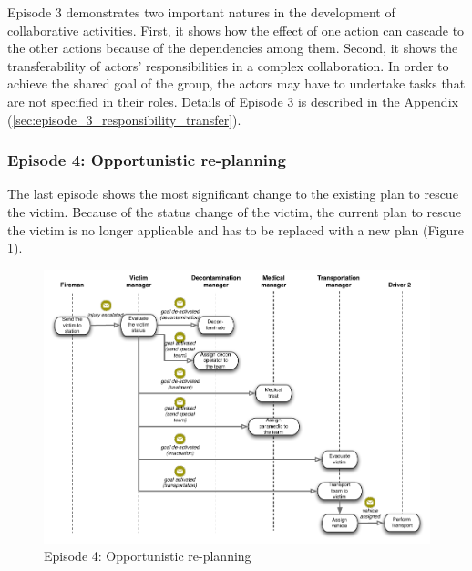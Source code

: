 Episode 3 demonstrates two important natures in the development of collaborative activities. First, it shows how the effect of one action can cascade to the other actions because of the dependencies among them. Second, it shows the transferability of actors' responsibilities in a complex collaboration. In order to achieve the shared goal of the group, the actors may have to undertake tasks that are not specified in their roles. Details of Episode 3 is described in the Appendix (\ref{sec:episode_3_responsibility_transfer}).

\subsubsection{Episode 4: Opportunistic re-planning} %
\label{ssub:episode_4_opportunistic_re_planning}
The last episode shows the most significant change to the existing plan to rescue the victim. Because of the status change of the victim, the current plan to rescue the victim is no longer applicable and has to be replaced with a new plan (Figure \ref{fig:episode_4_interaction}).

\begin{figure}[htbp] %
   \centering
   \includegraphics[width=5.8in]{episode_4_interaction.pdf} 
   \caption{Episode 4: Opportunistic re-planning}
   \label{fig:episode_4_interaction}
\end{figure}

